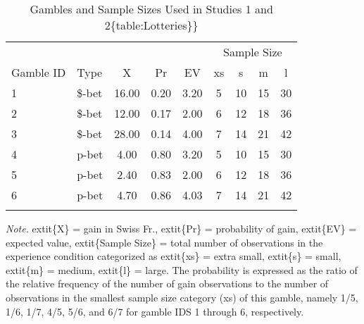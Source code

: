 \documentclass[]{standalone}
\begin{document}
\begin{table}[H]
\begin{center}
\begin{threeparttable}
\caption{\label{tab:unnamed-chunk-1}Gambles and Sample Sizes Used in Studies 1 and 2\{table:Lotteries\}\}}
\begin{tabular}{llccccccc}
\toprule
 &  &  &  &  & \multicolumn{4}{c}{Sample Size} \\
\cmidrule(r){6-9}
Gamble ID & Type & X & Pr & EV & xs & s & m & l\\
\midrule
1 & \$-bet & 16.00 & 0.20 & 3.20 & 5 & 10 & 15 & 30\\
2 & \$-bet & 12.00 & 0.17 & 2.00 & 6 & 12 & 18 & 36\\
3 & \$-bet & 28.00 & 0.14 & 4.00 & 7 & 14 & 21 & 42\\
4 & p-bet & 4.00 & 0.80 & 3.20 & 5 & 10 & 15 & 30\\
5 & p-bet & 2.40 & 0.83 & 2.00 & 6 & 12 & 18 & 36\\
6 & p-bet & 4.70 & 0.86 & 4.03 & 7 & 14 & 21 & 42\\
\bottomrule
\addlinespace
\end{tabular}
\begin{tablenotes}[para]
\normalsize{\textit{Note.}  extit\{X\} = gain in Swiss Fr.,     extit\{Pr\} = probability of gain,  extit\{EV\} = expected value,   extit\{Sample Size\} = total number of observations in the experience condition categorized as  extit\{xs\} = extra small,  extit\{s\} = small,     extit\{m\} = medium,    extit\{l\} = large. The probability is expressed as the ratio of the relative frequency of the number of gain observations to the number of observations in the smallest sample size category (xs) of this gamble, namely 1/5, 1/6, 1/7, 4/5, 5/6, and 6/7 for gamble IDS 1 through 6, respectively.}
\end{tablenotes}
\end{threeparttable}
\end{center}
\end{table}
\end{document}
